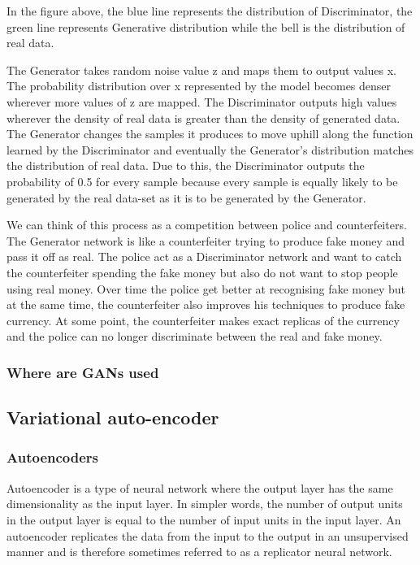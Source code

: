 In the figure above, the blue line represents the distribution of Discriminator, the green line represents Generative distribution while the bell is the distribution of real data.

The Generator takes random noise value z and maps them to output values x. The probability distribution over x represented by the model becomes denser wherever more values of z are mapped. The Discriminator outputs high values wherever the density of real data is greater than the density of generated data. The Generator changes the samples it produces to move uphill along the function learned by the Discriminator and eventually the Generator’s distribution matches the distribution of real data. Due to this, the Discriminator outputs the probability of 0.5 for every sample because every sample is equally likely to be generated by the real data-set as it is to be generated by the Generator.

We can think of this process as a competition between police and counterfeiters. The Generator network is like a counterfeiter trying to produce fake money and pass it off as real. The police act as a Discriminator network and want to catch the counterfeiter spending the fake money but also do not want to stop people using real money. Over time the police get better at recognising fake money but at the same time, the counterfeiter also improves his techniques to produce fake currency. At some point, the counterfeiter makes exact replicas of the currency and the police can no longer discriminate between the real and fake money.

\subsubsection{Where are GANs used}

\subsection{Variational auto-encoder}

\subsubsection{Autoencoders}

Autoencoder is a type of neural network where the output layer has the same dimensionality as the input layer. In simpler words, the number of output units in the output layer is equal to the number of input units in the input layer. An autoencoder replicates the data from the input to the output in an unsupervised manner and is therefore sometimes referred to as a replicator neural network.

